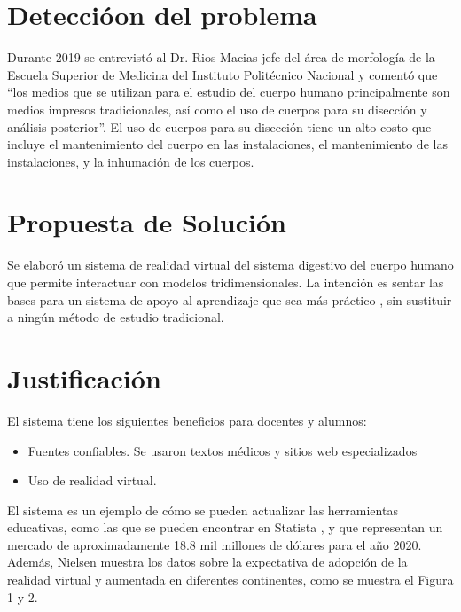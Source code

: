 \documentclass[11pt]{report}
\begin{document}
\newpage

\section{Detecci\'oon del problema} 

Durante 2019 se entrevistó al Dr. Rios Macias jefe del área de morfología de la Escuela Superior de Medicina del Instituto Politécnico Nacional y comentó que “los medios que se utilizan para el estudio del cuerpo humano principalmente son medios impresos tradicionales, así como el uso de cuerpos para su disección y análisis posterior”. El uso de cuerpos para su disección tiene un alto costo que incluye el mantenimiento del cuerpo en las instalaciones, el mantenimiento de las instalaciones, y la inhumación de los cuerpos.
\\
\newline
\section{Propuesta de Solución}

Se elaboró un sistema de realidad virtual del sistema digestivo del cuerpo humano que permite interactuar con modelos tridimensionales. La intención es sentar las bases para un sistema de apoyo al aprendizaje que sea más práctico \cite{moore1995learning}, sin sustituir a ningún método de estudio tradicional.
\\
\newline
\section{Justificación}
\label{just}

El sistema tiene los siguientes beneficios para docentes y alumnos: 
\begin{itemize}
\item Fuentes confiables. Se usaron textos médicos y sitios web especializados
\item Uso de realidad virtual\cite{norton1994integrating}.
\end{itemize}

El sistema es un ejemplo de cómo se pueden actualizar las herramientas educativas, como las que se pueden encontrar en Statista \cite{web1}, y que representan un mercado de aproximadamente 18.8 mil millones de dólares para el año 2020. Además, Nielsen\cite{web2} muestra los datos sobre la expectativa de adopción de la realidad virtual y aumentada en diferentes continentes, como se muestra el Figura 1 y 2.
\end{document}
